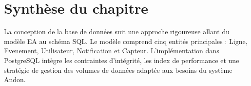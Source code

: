 \section{Synth\`ese du chapitre}

La conception de la base de donn\'ees suit une approche rigoureuse allant du mod\`ele EA au sch\'ema SQL. Le mod\`ele comprend cinq entit\'es principales : Ligne, Evenement, Utilisateur, Notification et Capteur. L'impl\'ementation dans PostgreSQL int\`egre les contraintes d'int\'egrit\'e, les index de performance et une strat\'egie de gestion des volumes de donn\'ees adapt\'ee aux besoins du syst\`eme Andon.
